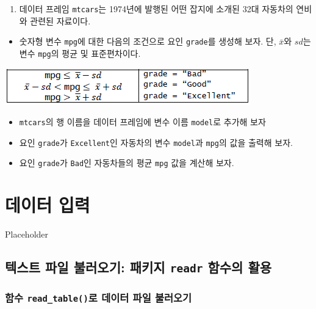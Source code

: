 \documentclass[
]{book}
\providecommand{\tightlist}{%
  \setlength{\itemsep}{0pt}\setlength{\parskip}{0pt}}
\begin{document}
\begin{enumerate}
\def\labelenumi{\arabic{enumi}.}
\setcounter{enumi}{1}
\tightlist
\item
  데이터 프레임 \texttt{mtcars}는 1974년에 발행된 어떤 잡지에 소개된 32대 자동차의 연비와 관련된 자료이다.
\end{enumerate}

\begin{itemize}
\tightlist
\item
  숫자형 변수 \texttt{mpg}에 대한 다음의 조건으로 요인 \texttt{grade}를 생성해 보자. 단, \(\bar{x}\)와 \(sd\)는 변수 \texttt{mpg}의 평균 및 표준편차이다.
\end{itemize}

\includegraphics{Figure/ch2_ex_21_2.PNG}

\begin{itemize}
\item
  \texttt{mtcars}의 행 이름을 데이터 프레임에 변수 이름 \texttt{model}로 추가해 보자
\item
  요인 \texttt{grade}가 \texttt{Excellent}인 자동차의 변수 \texttt{model}과 \texttt{mpg}의 값을 출력해 보자.
\item
  요인 \texttt{grade}가 \texttt{Bad}인 자동차들의 평균 \texttt{mpg} 값을 계산해 보자.
\end{itemize}

\hypertarget{uxb370uxc774uxd130-uxc785uxb825}{%
\chapter{데이터 입력}\label{uxb370uxc774uxd130-uxc785uxb825}}

Placeholder

\hypertarget{uxd14duxc2a4uxd2b8-uxd30cuxc77c-uxbd88uxb7ecuxc624uxae30-uxd328uxd0a4uxc9c0-readr-uxd568uxc218uxc758-uxd65cuxc6a9}{%
\section{\texorpdfstring{텍스트 파일 불러오기: 패키지 \texttt{readr} 함수의 활용}{텍스트 파일 불러오기: 패키지 readr 함수의 활용}}\label{uxd14duxc2a4uxd2b8-uxd30cuxc77c-uxbd88uxb7ecuxc624uxae30-uxd328uxd0a4uxc9c0-readr-uxd568uxc218uxc758-uxd65cuxc6a9}}

\hypertarget{uxd568uxc218-read_tableuxb85c-uxb370uxc774uxd130-uxd30cuxc77c-uxbd88uxb7ecuxc624uxae30}{%
\subsection{\texorpdfstring{함수 \texttt{read\_table()}로 데이터 파일 불러오기}{함수 read\_table()로 데이터 파일 불러오기}}\label{uxd568uxc218-read_tableuxb85c-uxb370uxc774uxd130-uxd30cuxc77c-uxbd88uxb7ecuxc624uxae30}}
\end{document}
